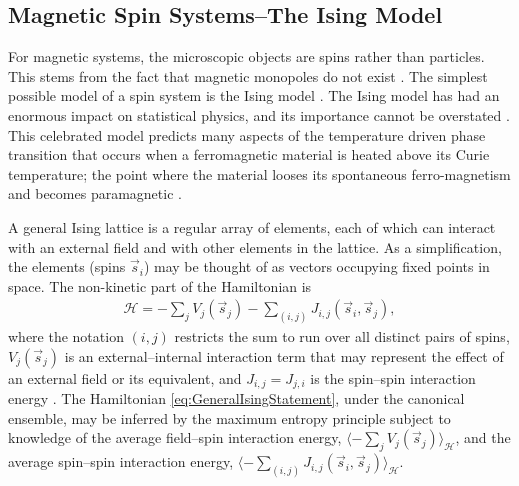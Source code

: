 \documentclass[english,12pt]{ttuthes}
\newcommand{\Hc}{\mathcal{H}}
\begin{document}
\subsection{Magnetic Spin Systems--The Ising Model}
\label{sec:MagneticSpinSystems}
%
For magnetic systems, the microscopic objects are spins rather than
particles. This stems from the fact that magnetic monopoles do not
exist \cite{Griffiths-1999}. The simplest possible model of a spin
system is the Ising model \cite{Robertson-1993}. The Ising model has
had an enormous impact on statistical physics, and its importance
cannot be overstated \cite{Christensen-2005}. This celebrated model
predicts many aspects of the temperature driven phase transition that
occurs when a ferromagnetic material is heated above its Curie
temperature; the point where the material looses its spontaneous
ferro-magnetism and becomes paramagnetic
\cite{Griffiths-1999,Ruelle-1969,Firas,Robertson-1993,Christensen-2005}.

A general Ising lattice is a regular array of elements, each of which
can interact with an external field and with other elements in the
lattice. As a simplification, the elements (spins $\vec{s}_i$) may be
thought of as vectors occupying fixed points in space. The non-kinetic
part of the Hamiltonian is \cite{Robertson-1993}     
%
\begin{align} \label{eq:GeneralIsingStatement}
  \Hc=- \sum_j V_j(\vec{s}_j)
            -\sum_{(i,j)} J_{i,j}(\vec{s}_i,\vec{s}_j),
\end{align}
%
where the notation $(i,j)$ restricts the sum to run over all
distinct pairs of spins, $V_j(\vec{s}_j)$ is an external--internal
interaction term that may represent the effect of an external field or
its equivalent, and $J_{i,j}=J_{j,i}$ is the spin--spin interaction
energy \cite{Robertson-1993}.  The Hamiltonian
\eqref{eq:GeneralIsingStatement}, under the canonical ensemble, may be 
inferred by the maximum entropy principle subject to knowledge of the  
average field--spin interaction energy, $\langle-\sum_jV_j(\vec{s}_j)\rangle_{\Hc}$, and the average
spin--spin interaction energy,
$\langle-\sum_{(i,j)}J_{i,j}(\vec{s}_i,\vec{s}_j)\rangle_{\Hc}$. 
\end{document}
